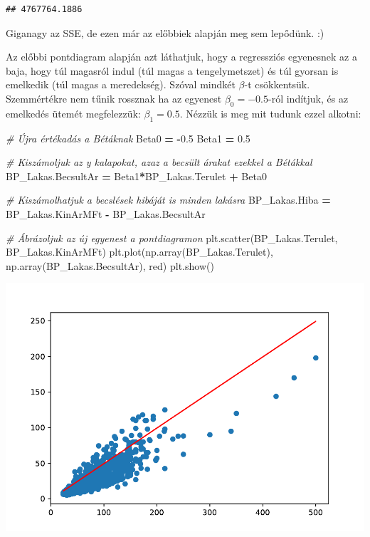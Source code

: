 \documentclass[
]{book}
\newenvironment{Shaded}{\begin{snugshade}}{\end{snugshade}}
\newcommand{\CommentTok}[1]{\textcolor[rgb]{0.56,0.35,0.01}{\textit{#1}}}
\newcommand{\FloatTok}[1]{\textcolor[rgb]{0.00,0.00,0.81}{#1}}
\newcommand{\NormalTok}[1]{#1}
\newcommand{\OperatorTok}[1]{\textcolor[rgb]{0.81,0.36,0.00}{\textbf{#1}}}
\newcommand{\StringTok}[1]{\textcolor[rgb]{0.31,0.60,0.02}{#1}}
\begin{document}
\begin{verbatim}
## 4767764.1886
\end{verbatim}

Giganagy az SSE, de ezen már az előbbiek alapján meg sem lepődünk. :)

Az előbbi pontdiagram alapján azt láthatjuk, hogy a regressziós egyenesnek az a baja, hogy túl magasról indul (túl magas a tengelymetszet) és túl gyorsan is emelkedik (túl magas a meredekség). Szóval mindkét \(\beta\)-t csökkentsük. Szemmértékre nem tűnik rossznak ha az egyenest \(\beta_0=-0.5\)-ról indítjuk, és az emelkedés ütemét megfelezzük: \(\beta_1=0.5\). Nézzük is meg mit tudunk ezzel alkotni:

\begin{Shaded}
\begin{Highlighting}[]
\CommentTok{\# Újra értékadás a Bétáknak}
\NormalTok{Beta0 }\OperatorTok{=} \OperatorTok{{-}}\FloatTok{0.5}
\NormalTok{Beta1 }\OperatorTok{=} \FloatTok{0.5}

\CommentTok{\# Kiszámoljuk az y kalapokat, azaz a becsült árakat ezekkel a Bétákkal}
\NormalTok{BP\_Lakas.BecsultAr }\OperatorTok{=}\NormalTok{ Beta1}\OperatorTok{*}\NormalTok{BP\_Lakas.Terulet }\OperatorTok{+}\NormalTok{ Beta0}

\CommentTok{\# Kiszámolhatjuk a becslések hibáját is minden lakásra}
\NormalTok{BP\_Lakas.Hiba }\OperatorTok{=}\NormalTok{ BP\_Lakas.KinArMFt }\OperatorTok{{-}}\NormalTok{ BP\_Lakas.BecsultAr}

\CommentTok{\# Ábrázoljuk az új egyenest a pontdiagramon}
\NormalTok{plt.scatter(BP\_Lakas.Terulet, BP\_Lakas.KinArMFt)}
\NormalTok{plt.plot(np.array(BP\_Lakas.Terulet),}
\NormalTok{         np.array(BP\_Lakas.BecsultAr), }\StringTok{\textquotesingle{}red\textquotesingle{}}\NormalTok{)}
\NormalTok{plt.show()}
\end{Highlighting}
\end{Shaded}

\includegraphics{_main_files/figure-latex/unnamed-chunk-388-41.pdf}
\end{document}
